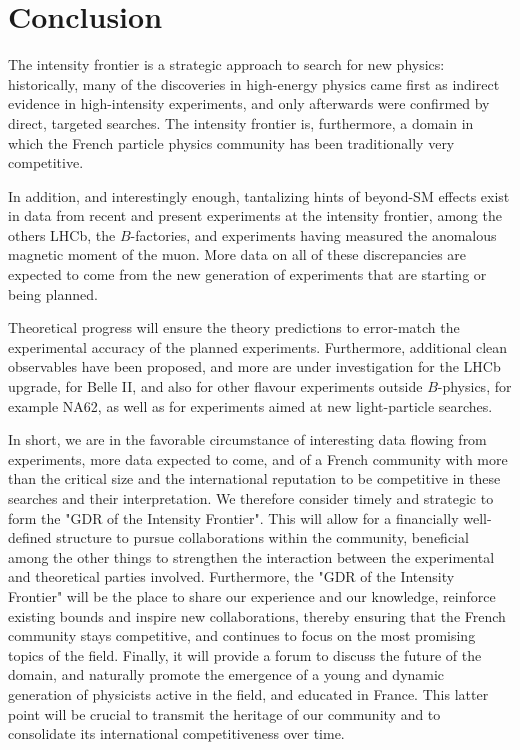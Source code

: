 \section{Conclusion}

The intensity frontier is a strategic approach to search for new physics: historically, many of the discoveries in high-energy physics came first as indirect evidence in high-intensity experiments, and only afterwards were confirmed by direct, targeted searches. The intensity frontier is, furthermore, a domain in which the French particle physics community has been traditionally very competitive.

In addition, and interestingly enough, tantalizing hints of beyond-SM effects exist in data from recent and present experiments at the intensity frontier, among the others LHCb, the $B$-factories, and experiments having measured the anomalous magnetic moment of the muon. More data on all of these discrepancies are expected to come from the new generation of experiments that are starting or being planned.

Theoretical progress will ensure the theory predictions to error-match the experimental accuracy of the planned experiments. Furthermore, additional clean observables have been proposed, and more are under investigation for the LHCb upgrade, for Belle II, and also for other flavour experiments outside $B$-physics, for example NA62, as well as for experiments aimed at new light-particle searches.

In short, we are in the favorable circumstance of interesting data flowing from experiments, more data expected to come, and of a French community with more than the critical size and the international reputation to be competitive in these searches and their interpretation. We therefore consider timely and strategic to form the "GDR of the Intensity Frontier". This  will allow for a financially well-defined structure to pursue collaborations within the community, beneficial among the other things to strengthen the interaction between the experimental and theoretical parties involved. Furthermore, the "GDR of the Intensity Frontier" will be the place to share our experience and our knowledge, reinforce existing bounds and inspire new collaborations, thereby ensuring that the French community stays competitive, and continues to focus on the most promising topics of the field. Finally, it will provide a forum to discuss the future of the domain, and naturally promote the emergence of a young and dynamic generation of physicists active in the field, and educated in France. This latter point will be crucial to transmit the heritage of our community and to consolidate its international competitiveness over time.
